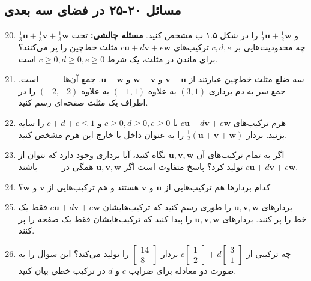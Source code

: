 \documentclass[12pt, a4paper]{book}
\begin{document}
	\subsection*{مسائل ۲۰-۲۵ در فضای سه بعدی}
	\begin{enumerate}
		\setcounter{enumi}{19}
		\item $\frac{1}{3}\mathbf{u}+\frac{1}{3}\mathbf{v}+\frac{1}{3}\mathbf{w}$ و $\frac{1}{2}\mathbf{u}+\frac{1}{2}\mathbf{w}$ را در شکل ۱.۵ ب مشخص کنید. \textbf{مسئله چالشی:} تحت چه محدودیت‌هایی بر $c, d, e$ ترکیب‌های $c\mathbf{u}+d\mathbf{v}+e\mathbf{w}$ مثلث خط‌چین را پر می‌کنند؟ برای ماندن در مثلث، یک شرط $c \ge 0, d \ge 0, e \ge 0$ است.
		\item سه ضلع مثلث خط‌چین عبارتند از $\mathbf{v}-\mathbf{u}$ و $\mathbf{w}-\mathbf{v}$ و $\mathbf{u}-\mathbf{w}$. جمع آن‌ها \_\_\_ است. جمع سر به دم برداری $(3,1)$ به علاوه $(-1,1)$ به علاوه $(-2,-2)$ را در اطراف یک مثلث صفحه‌ای رسم کنید.
		\item هرم ترکیب‌های $c\mathbf{u}+d\mathbf{v}+e\mathbf{w}$ با $c \ge 0, d \ge 0, e \ge 0$ و $c+d+e \le 1$ را سایه بزنید. بردار $\frac{1}{2}(\mathbf{u}+\mathbf{v}+\mathbf{w})$ را به عنوان داخل یا خارج این هرم مشخص کنید.
		\item اگر به تمام ترکیب‌های آن $\mathbf{u, v, w}$ نگاه کنید، آیا برداری وجود دارد که نتوان از $c\mathbf{u}+d\mathbf{v}+e\mathbf{w}$ تولید کرد؟ پاسخ متفاوت است اگر $\mathbf{u, v, w}$ همگی در \_\_\_ باشند.
		\item کدام بردارها هم ترکیب‌هایی از $\mathbf{u}$ و $\mathbf{v}$ هستند و هم ترکیب‌هایی از $\mathbf{v}$ و $\mathbf{w}$؟
		\item بردارهای $\mathbf{u,v,w}$ را طوری رسم کنید که ترکیب‌هایشان $c\mathbf{u}+d\mathbf{v}+e\mathbf{w}$ فقط یک خط را پر کنند. بردارهای $\mathbf{u,v,w}$ را پیدا کنید که ترکیب‌هایشان فقط یک صفحه را پر کنند.
		\item چه ترکیبی از $c\begin{bmatrix} 1 \\ 2 \end{bmatrix} + d\begin{bmatrix} 3 \\ 1 \end{bmatrix}$ بردار $\begin{bmatrix} 14 \\ 8 \end{bmatrix}$ را تولید می‌کند؟ این سوال را به صورت دو معادله برای ضرایب $c$ و $d$ در ترکیب خطی بیان کنید.
	\end{enumerate}
	
\end{document}
